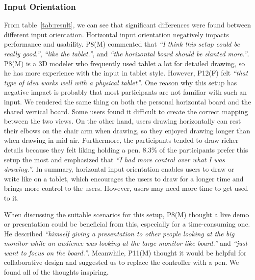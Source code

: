 \documentclass{sigchi}
\begin{document}
\subsubsection{Input Orientation}
From table~\ref{tab:result}, we can see that significant differences were found between different input orientation. Horizontal input orientation negatively impacts performance and usability. P8(M) commented that \textit{``I think this setup could be really good.''}, \textit{``like the tablet.''}, and \textit{``the horizontal board should be slanted more.''}. P8(M) is a 3D modeler who frequently used tablet a lot for detailed drawing, so he has more experience with the input in tablet style. However, P12(F) felt \textit{``that type of idea works well with a physical tablet''}. One reason why this setup has negative impact is probably that most participants are not familiar with such an input. We rendered the same thing on both the personal horizontal board and the shared vertical board. Some users found it difficult to create the correct mapping between the two views. On the other hand, users drawing horizontally can rest their elbows on the chair arm when drawing, so they enjoyed drawing longer than when drawing in mid-air. Furthermore, the participants tended to draw richer details because they felt liking holding a pen. 8.3\% of the participants prefer this setup the most and emphasized that \textit{``I had more control over what I was drawing.''}. In summary, horizontal input orientation enables users to draw or write like on a tablet, which encourages the users to draw for a longer time and brings more control to the users. However, users may need more time to get used to it.

When discussing the suitable scenarios for this setup, P8(M) thought a live demo or presentation could be beneficial from this, especially for a time-consuming one. He described \textit{``himself giving a presentation to other people looking at the big monitor while an audience was looking at the large monitor-like board.''} and \textit{``just want to focus on the board.''}. Meanwhile, P11(M) thought it would be helpful for collaborative design and suggested us to replace the controller with a pen. We found all of the thoughts inspiring.
\end{document}
